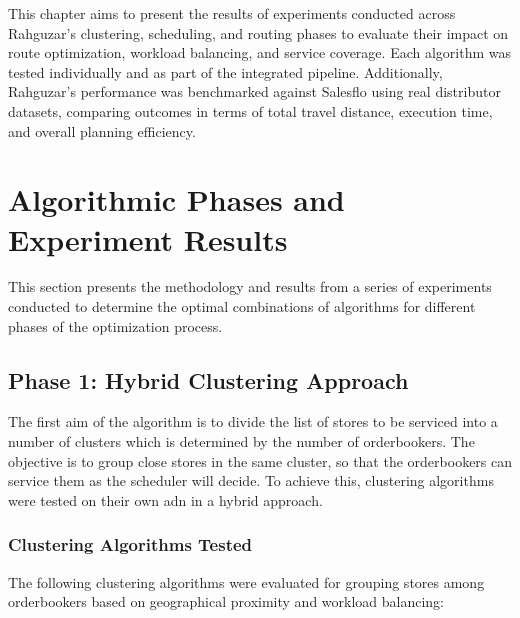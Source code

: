 This chapter aims to present the results of experiments conducted across Rahguzar’s clustering, scheduling, and routing phases to evaluate their impact on route optimization, workload balancing, and service coverage. Each algorithm was tested individually and as part of the integrated pipeline. Additionally, Rahguzar’s performance was benchmarked against Salesflo using real distributor datasets, comparing outcomes in terms of total travel distance, execution time, and overall planning efficiency.

\section{Algorithmic Phases and Experiment Results}

This section presents the methodology and results from a series of experiments conducted to determine the optimal combinations of algorithms for different phases of the optimization process.




\subsection{Phase 1: Hybrid Clustering Approach}
The first aim of the algorithm is to divide the list of stores to be serviced into a number of clusters which is determined by the number of orderbookers.
The objective is to group close stores in the same cluster, so that the orderbookers can service them as the scheduler will decide.
To achieve this, clustering algorithms were tested on their own adn in a hybrid approach.

\subsubsection{Clustering Algorithms Tested}

The following clustering algorithms were evaluated for grouping stores among orderbookers based on geographical proximity and workload balancing:

